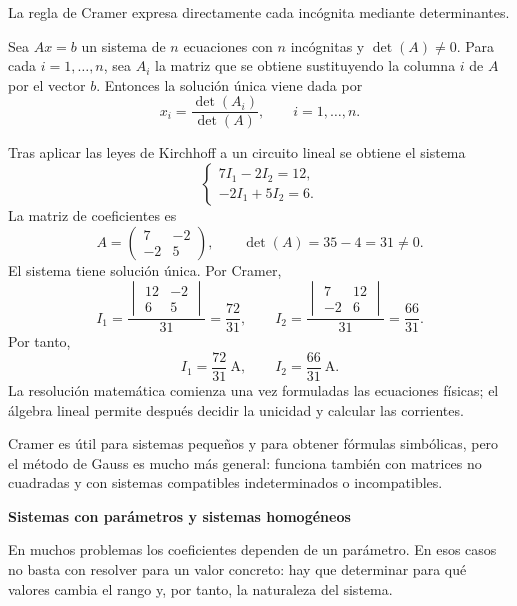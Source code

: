 La regla de Cramer expresa directamente cada incógnita mediante determinantes.

\begin{theorem}
Sea $Ax=b$ un sistema de $n$ ecuaciones con $n$ incógnitas y $\det(A)\neq0$. Para cada $i=1,\ldots,n$, sea $A_i$ la matriz que se obtiene sustituyendo la columna $i$ de $A$ por el vector $b$. Entonces la solución única viene dada por
\[
\boxed{x_i=\frac{\det(A_i)}{\det(A)},\qquad i=1,\ldots,n.}
\]
\end{theorem}

\begin{example}
Tras aplicar las leyes de Kirchhoff a un circuito lineal se obtiene el sistema
\[
\begin{cases}
7I_1-2I_2=12,\\
-2I_1+5I_2=6.
\end{cases}
\]
La matriz de coeficientes es
\[
A=\begin{pmatrix}7&-2\\-2&5\end{pmatrix},
\qquad
\det(A)=35-4=31\neq0.
\]
El sistema tiene solución única. Por Cramer,
\[
I_1=
\frac{\begin{vmatrix}12&-2\\6&5\end{vmatrix}}{31}
=\frac{72}{31},
\qquad
I_2=
\frac{\begin{vmatrix}7&12\\-2&6\end{vmatrix}}{31}
=\frac{66}{31}.
\]
Por tanto,
\[
\boxed{I_1=\frac{72}{31}\ \mathrm A,\qquad I_2=\frac{66}{31}\ \mathrm A.}
\]
La resolución matemática comienza una vez formuladas las ecuaciones físicas; el álgebra lineal permite después decidir la unicidad y calcular las corrientes.
\end{example}

Cramer es útil para sistemas pequeños y para obtener fórmulas simbólicas, pero el método de Gauss es mucho más general: funciona también con matrices no cuadradas y con sistemas compatibles indeterminados o incompatibles.

\textbf{Sistemas con parámetros y sistemas homogéneos}

En muchos problemas los coeficientes dependen de un parámetro. En esos casos no basta con resolver para un valor concreto: hay que determinar para qué valores cambia el rango y, por tanto, la naturaleza del sistema.


